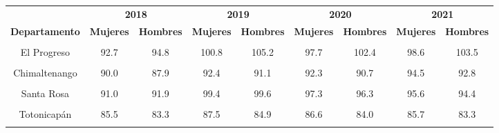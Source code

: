 \begin{tabular}[t]{ccccccccc}
\toprule
\multicolumn{1}{c}{\textbf{ }} & \multicolumn{2}{c}{\textbf{2018}} & \multicolumn{2}{c}{\textbf{2019}} & \multicolumn{2}{c}{\textbf{2020}} & \multicolumn{2}{c}{\textbf{2021}} \\
\cmidrule(l{3pt}r{3pt}){2-3} \cmidrule(l{3pt}r{3pt}){4-5} \cmidrule(l{3pt}r{3pt}){6-7} \cmidrule(l{3pt}r{3pt}){8-9}
\textbf{Departamento} & \textbf{Mujeres} & \textbf{Hombres} & \textbf{Mujeres} & \textbf{Hombres} & \textbf{Mujeres} & \textbf{Hombres} & \textbf{Mujeres} & \textbf{Hombres}\\
\midrule
\cellcolor[HTML]{B6B3FF}{Guatemala} & \cellcolor[HTML]{B6B3FF}{100.1} & \cellcolor[HTML]{B6B3FF}{99.2} & \cellcolor[HTML]{B6B3FF}{106.4} & \cellcolor[HTML]{B6B3FF}{105.6} & \cellcolor[HTML]{B6B3FF}{104.0} & \cellcolor[HTML]{B6B3FF}{103.0} & \cellcolor[HTML]{B6B3FF}{100.8} & \cellcolor[HTML]{B6B3FF}{99.5}\\
El Progreso & 92.7 & 94.8 & 100.8 & 105.2 & 97.7 & 102.4 & 98.6 & 103.5\\
\cellcolor[HTML]{B6B3FF}{Sacatepéquez} & \cellcolor[HTML]{B6B3FF}{94.8} & \cellcolor[HTML]{B6B3FF}{93.9} & \cellcolor[HTML]{B6B3FF}{99.6} & \cellcolor[HTML]{B6B3FF}{99.3} & \cellcolor[HTML]{B6B3FF}{98.7} & \cellcolor[HTML]{B6B3FF}{98.4} & \cellcolor[HTML]{B6B3FF}{97.2} & \cellcolor[HTML]{B6B3FF}{96.5}\\
Chimaltenango & 90.0 & 87.9 & 92.4 & 91.1 & 92.3 & 90.7 & 94.5 & 92.8\\
\cellcolor[HTML]{B6B3FF}{Escuintla} & \cellcolor[HTML]{B6B3FF}{90.9} & \cellcolor[HTML]{B6B3FF}{94.1} & \cellcolor[HTML]{B6B3FF}{102.4} & \cellcolor[HTML]{B6B3FF}{105.5} & \cellcolor[HTML]{B6B3FF}{99.7} & \cellcolor[HTML]{B6B3FF}{102.4} & \cellcolor[HTML]{B6B3FF}{98.7} & \cellcolor[HTML]{B6B3FF}{100.7}\\
Santa Rosa & 91.0 & 91.9 & 99.4 & 99.6 & 97.3 & 96.3 & 95.6 & 94.4\\
\cellcolor[HTML]{B6B3FF}{Sololá} & \cellcolor[HTML]{B6B3FF}{88.7} & \cellcolor[HTML]{B6B3FF}{88.9} & \cellcolor[HTML]{B6B3FF}{94.0} & \cellcolor[HTML]{B6B3FF}{93.6} & \cellcolor[HTML]{B6B3FF}{94.4} & \cellcolor[HTML]{B6B3FF}{94.1} & \cellcolor[HTML]{B6B3FF}{96.0} & \cellcolor[HTML]{B6B3FF}{94.5}\\
Totonicapán & 85.5 & 83.3 & 87.5 & 84.9 & 86.6 & 84.0 & 85.7 & 83.3\\
\cellcolor[HTML]{B6B3FF}{Quetzaltenango} & \cellcolor[HTML]{B6B3FF}{90.6} & \cellcolor[HTML]{B6B3FF}{92.3} & \cellcolor[HTML]{B6B3FF}{96.6} & \cellcolor[HTML]{B6B3FF}{97.8} & \cellcolor[HTML]{B6B3FF}{95.9} & \cellcolor[HTML]{B6B3FF}{96.5} & \cellcolor[HTML]{B6B3FF}{94.2} & \cellcolor[HTML]{B6B3FF}{94.0}\\

\end{tabular}

